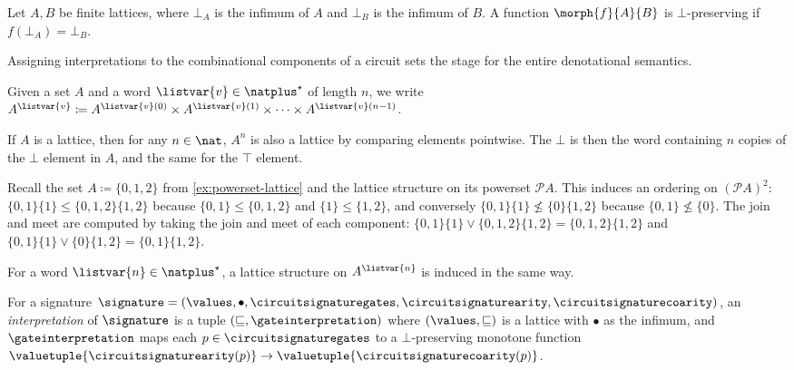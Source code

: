 \begin{definition}
    Let \(A,B\) be finite lattices, where \(\bot_A\) is the infimum of \(A\) and
    \(\bot_B\) is the infimum of \(B\).
    A function \(\morph{f}{A}{B}\) is \(\bot\)-preserving if
    \(f(\bot_A) = \bot_B\).
\end{definition}

Assigning interpretations to the combinational components of a circuit sets the
stage for the entire denotational semantics.

\begin{notation}
    Given a set \(A\) and a word \(\listvar{v} \in \natplus^\star\) of
    length \(n\), we write \(
        A^{\listvar{v}}
        \coloneqq
        A^{\listvar{v}(0)}
        \times
        A^{\listvar{v}(1)}
        \times
        \dots
        \times
        A^{\listvar{v}(n-1)}
    \).
\end{notation}

\begin{remark}
    If \(A\) is a lattice, then for any \(n \in \nat\), \(A^n\) is also a
    lattice by comparing elements pointwise.
    The \(\bot\) is then the word containing \(n\) copies of the \(\bot\)
    element in \(A\), and the same for the \(\top\) element.

    Recall the set \(A \coloneqq \{0,1,2\}\) from
    \cref{ex:powerset-lattice} and the lattice structure on its powerset
    \(\mathcal{P}A\).
    This induces an ordering on \((\mathcal{P}A)^2\):
    \(\{0,1\}\{1\} \leq \{0,1,2\}\{1,2\}\) because \(\{0,1\} \leq \{0,1,2\}\)
    and \(\{1\} \leq \{1,2\}\), and conversely
    \(\{0,1\}\{1\} \not\leq \{0\}\{1,2\}\) because \(\{0,1\} \not\leq \{0\}\).
    The join and meet are computed by taking the join and meet of each
    component: \(
        \{0,1\}\{1\} \vee \{0,1,2\}\{1,2\} = \{0,1,2\}\{1,2\}
    \) and \(
        \{0,1\}\{1\} \vee \{0\}\{1,2\} = \{0,1\}\{1,2\}
    \).

    For a word \(\listvar{n} \in \natplus^\star\), a lattice
    structure on \(A^{\listvar{n}}\) is induced in the same way.
\end{remark}

\begin{definition}[Interpretation]
    For a signature \(
        \signature = (
            \values, \bullet, \circuitsignaturegates, \circuitsignaturearity,
            \circuitsignaturecoarity
    )\), an \emph{interpretation} of
    \(\signature\) is a tuple \((\sqsubseteq, \gateinterpretation)\) where
    \((\values, \sqsubseteq)\) is a lattice with \(\bullet\) as the
    infimum, and \(\gateinterpretation\) maps each
    \(p \in \circuitsignaturegates\) to a \(\bot\)-preserving monotone function
    \(
        \valuetuple{\circuitsignaturearity(p)}
        \to
        \valuetuple{\circuitsignaturecoarity(p)}
    \).
\end{definition}

